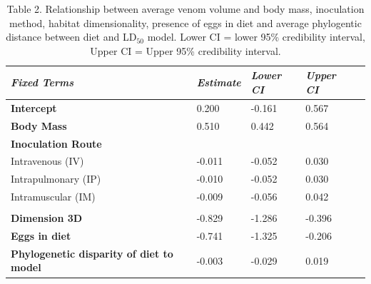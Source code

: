 \begin{table}[H]
  \centering
    \caption*{Table 2. Relationship between average venom volume and body mass, inoculation method, habitat dimensionality, presence of eggs in diet and average phylogentic distance between diet and LD$_{50}$ model. Lower CI = lower 95\% credibility interval, Upper CI = Upper 95\% credibility interval.}
\begin{tabular}{*5l}    \toprule
\emph{Fixed Terms} & \emph{Estimate} & \emph{Lower CI} & \emph{Upper CI}\\\midrule
\textbf{Intercept} & 0.200  &  -0.161 & 0.567 \\ 
\textbf{Body Mass} & 0.510  & 0.442 & 0.564 \\ 
\textbf{Inoculation Route} &  &  &  \\ 
 Intravenous (IV) &  -0.011 &  -0.052 & 0.030 \\
 Intrapulmonary (IP) &  -0.010 &  -0.052 & 0.030 \\ 
 Intramuscular (IM) &  -0.009 &  -0.056 & 0.042 \\
  &  &  &  \\ 
\textbf{Dimension 3D} &  -0.829 &  -1.286 &  -0.396 \\ 
\textbf{Eggs in diet} &  -0.741 &  -1.325 &  -0.206 \\ 
\textbf{Phylogenetic disparity of diet to model} &  -0.003 &  -0.029 & 0.019 \\\bottomrule
 \hline
\end{tabular}
  \label{tbl:Table 2.}
\end{table}




